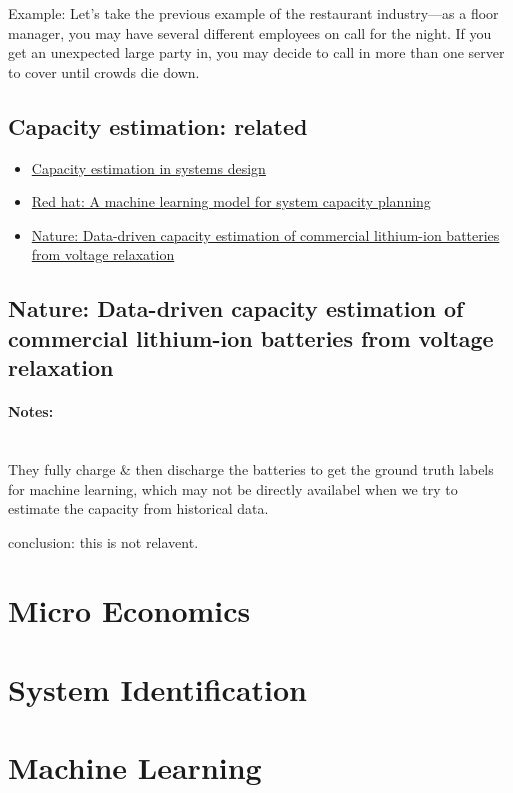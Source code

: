 \documentclass{article}
\begin{document}
Example: Let’s take the previous example of the restaurant industry—as a floor manager, you may have several different employees on call for the night. If you get an unexpected large party in, you may decide to call in more than one server to cover until crowds die down.

\subsection{Capacity estimation: related}
\begin{itemize}
\item \href{https://www.geeksforgeeks.org/capacity-estimation-in-systems-design/}{Capacity estimation in systems design}
\item \href{https://www.redhat.com/en/blog/machine-learning-capacity-planning}{Red hat: A machine learning model for system capacity planning}
\item \href{https://www.nature.com/articles/s41467-022-29837-w}{Nature: Data-driven capacity estimation of commercial lithium-ion batteries from voltage relaxation}
\end{itemize}

\subsection{Nature: Data-driven capacity estimation of commercial lithium-ion batteries from voltage relaxation}
\paragraph{Notes:}~\\
They fully charge \& then discharge the batteries to get the ground truth labels for machine learning, which may not be directly availabel when we try to estimate the capacity from historical data.

conclusion: this is not relavent.


\section{Micro Economics}
\section{System Identification}
\section{Machine Learning}
\end{document}

